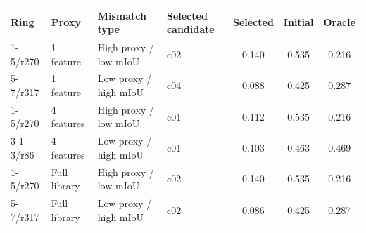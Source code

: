 \begin{tabular}{p{}p{}p{}p{}ccc}
\toprule
Ring & Proxy & Mismatch type & Selected candidate & Selected & Initial & Oracle \\
\midrule
1-5/r270 & 1 feature & High proxy / low mIoU & c02 & 0.140 & 0.535 & 0.216 \\
5-7/r317 & 1 feature & Low proxy / high mIoU & c04 & 0.088 & 0.425 & 0.287 \\
1-5/r270 & 4 features & High proxy / low mIoU & c01 & 0.112 & 0.535 & 0.216 \\
3-1-3/r86 & 4 features & Low proxy / high mIoU & c01 & 0.103 & 0.463 & 0.469 \\
1-5/r270 & Full library & High proxy / low mIoU & c02 & 0.140 & 0.535 & 0.216 \\
5-7/r317 & Full library & Low proxy / high mIoU & c02 & 0.086 & 0.425 & 0.287 \\
\bottomrule
\end{tabular}
